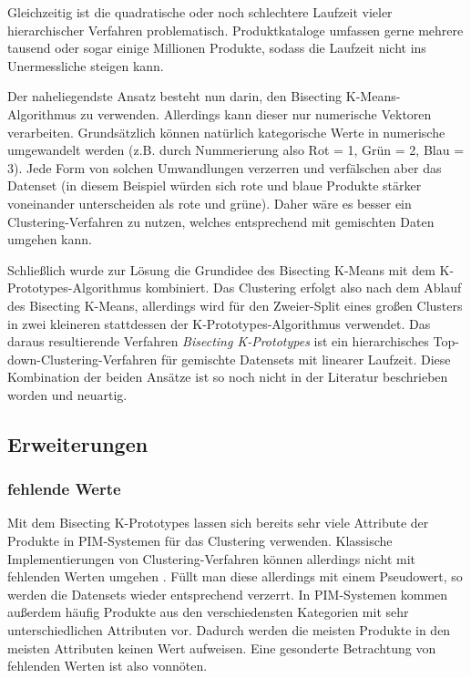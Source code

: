 Gleichzeitig ist die quadratische oder noch schlechtere Laufzeit vieler
hierarchischer Verfahren problematisch. Produktkataloge umfassen gerne
mehrere tausend oder sogar einige Millionen Produkte, sodass die
Laufzeit nicht ins Unermessliche steigen kann.

Der naheliegendste Ansatz besteht nun darin, den Bisecting
K-Means-Algorithmus zu verwenden. Allerdings kann dieser nur numerische
Vektoren verarbeiten. Grundsätzlich können natürlich kategorische Werte
in numerische umgewandelt werden (z.B. durch Nummerierung also Rot = 1,
Grün = 2, Blau = 3). Jede Form von solchen Umwandlungen verzerren und
verfälschen aber das Datenset (in diesem Beispiel würden sich rote und
blaue Produkte stärker voneinander unterscheiden als rote und grüne).
Daher wäre es besser ein Clustering-Verfahren zu nutzen, welches
entsprechend mit gemischten Daten umgehen kann. \autocite[ Kap. 1.2.6
Mixed Variables]{kaufman2009}

Schließlich wurde zur Lösung die Grundidee des Bisecting K-Means mit dem
K-Prototypes-Algorithmus kombiniert. Das Clustering erfolgt also nach
dem Ablauf des Bisecting K-Means, allerdings wird für den Zweier-Split
eines großen Clusters in zwei kleineren stattdessen der
K-Prototypes-Algorithmus verwendet. Das daraus resultierende Verfahren
\emph{Bisecting K-Prototypes} ist ein hierarchisches
Top-down-Clustering-Verfahren für gemischte Datensets mit linearer
Laufzeit. Diese Kombination der beiden Ansätze ist so noch nicht in der
Literatur beschrieben worden und neuartig.

\hypertarget{erweiterungen}{%
\subsection{Erweiterungen}\label{erweiterungen}}

\hypertarget{fehlende-werte}{%
\subsubsection{fehlende Werte}\label{fehlende-werte}}

Mit dem Bisecting K-Prototypes lassen sich bereits sehr viele Attribute
der Produkte in PIM-Systemen für das Clustering verwenden. Klassische
Implementierungen von Clustering-Verfahren können allerdings nicht mit
fehlenden Werten umgehen \autocites[siehe diverse Python-Libraries
wie][]{apache2022bikmeans,nicodv2022,sklearn2022}. Füllt man diese
allerdings mit einem Pseudowert, so werden die Datensets wieder
entsprechend verzerrt. In PIM-Systemen kommen außerdem häufig Produkte
aus den verschiedensten Kategorien mit sehr unterschiedlichen Attributen
vor. Dadurch werden die meisten Produkte in den meisten Attributen
keinen Wert aufweisen. Eine gesonderte Betrachtung von fehlenden Werten
ist also vonnöten.

